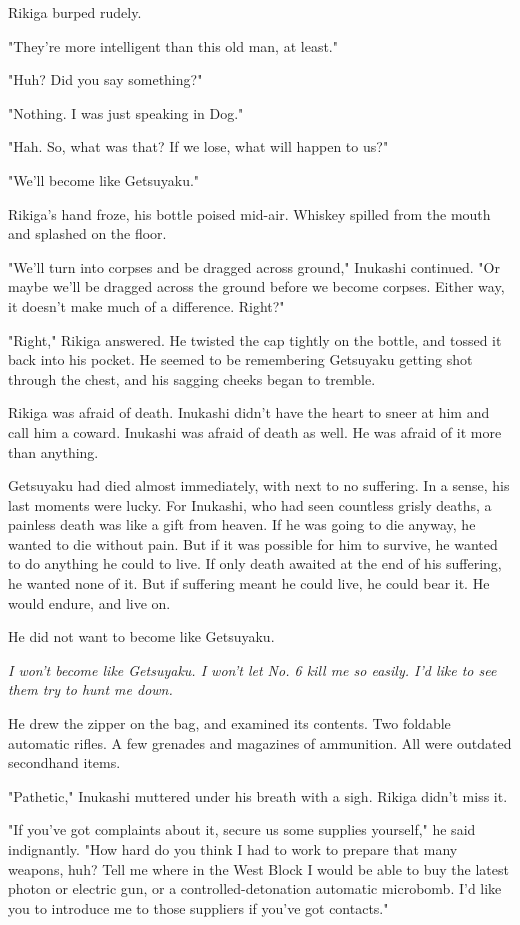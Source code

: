 Rikiga burped rudely.

"They're more intelligent than this old man, at least."

"Huh? Did you say something?"

"Nothing. I was just speaking in Dog."

"Hah. So, what was that? If we lose, what will happen to us?"

"We'll become like Getsuyaku."

Rikiga's hand froze, his bottle poised mid-air. Whiskey spilled from the
mouth and splashed on the floor.

"We'll turn into corpses and be dragged across ground," Inukashi
continued. "Or maybe we'll be dragged across the ground before we become
corpses. Either way, it doesn't make much of a difference. Right?"

"Right," Rikiga answered. He twisted the cap tightly on the bottle, and
tossed it back into his pocket. He seemed to be remembering Getsuyaku
getting shot through the chest, and his sagging cheeks began to tremble.

Rikiga was afraid of death. Inukashi didn't have the heart to sneer at
him and call him a coward. Inukashi was afraid of death as well. He was
afraid of it more than anything.

Getsuyaku had died almost immediately, with next to no suffering. In a
sense, his last moments were lucky. For Inukashi, who had seen countless
grisly deaths, a painless death was like a gift from heaven. If he was
going to die anyway, he wanted to die without pain. But if it was
possible for him to survive, he wanted to do anything he could to live.
If only death awaited at the end of his suffering, he wanted none of it.
But if suffering meant he could live, he could bear it. He would endure,
and live on.

He did not want to become like Getsuyaku.

\emph{I won't become like Getsuyaku. I won't let No. 6 kill me so easily. I'd
	like to see them try to hunt me down.}

He drew the zipper on the bag, and examined its contents. Two foldable
automatic rifles. A few grenades and magazines of ammunition. All were
outdated secondhand items.

"Pathetic," Inukashi muttered under his breath with a sigh. Rikiga
didn't miss it.

"If you've got complaints about it, secure us some supplies yourself,"
he said indignantly. "How hard do you think I had to work to prepare
that many weapons, huh? Tell me where in the West Block I would be able
to buy the latest photon or electric gun, or a controlled-detonation
automatic microbomb. I'd like you to introduce me to those suppliers if
you've got contacts."


